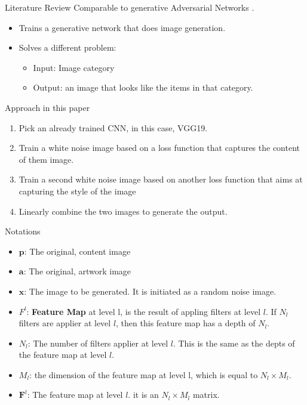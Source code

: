 \documentclass{beamer}
\begin{document}
\begin{frame}{Literature Review}
    Comparable to generative Adversarial 
    Networks \cite{dosovitskiy2016generating}. 
    \begin{itemize}
        \item Trains a generative network
            that does image generation.
        \item Solves a different problem:
            \begin{itemize}
                \item[] Input: Image category
                \item[] Output: an image that looks like
            the items in that category.
            \end{itemize}
    \end{itemize}
\end{frame}
\begin{frame}{Approach in this paper}
    \begin{enumerate}
        \item Pick an already trained CNN, in this
            case, VGG19.
        \item Train a white noise image based on a
            loss function that captures the content of 
            them image.
        \item Train a second white noise image
            based on another loss function that
            aims at capturing the style of the
            image
        \item Linearly combine the two images to
            generate the output.
    \end{enumerate}
\end{frame}

\begin{frame}{Notations}
    \begin{itemize}
        \item $\mathbf{p}$: The original, content image
        \item $\mathbf{a}$: The original, artwork image
        \item $\mathbf{x}$: The image to be generated. It is initiated as a
            random noise image.
        \item $F^l$: \textbf{Feature Map} at level l, is the result of appling
            filters at level $l$. If $N_l$ filters are applier at level $l$,
            then this feature map has a depth of $N_l$.
        \item $N_l$: The number of filters applier at level $l$. This is
            the same as the depts of the feature map at level
            $l$.
        \item $M_l$: the dimension of the feature map at level l, which
            is equal to $N_l \times M_l$.
        \item $\mathbf{F}^l$: The feature map at level $l$. it is an
            $N_l \times M_l$ matrix.
    \end{itemize}
\end{frame}
\end{document}
